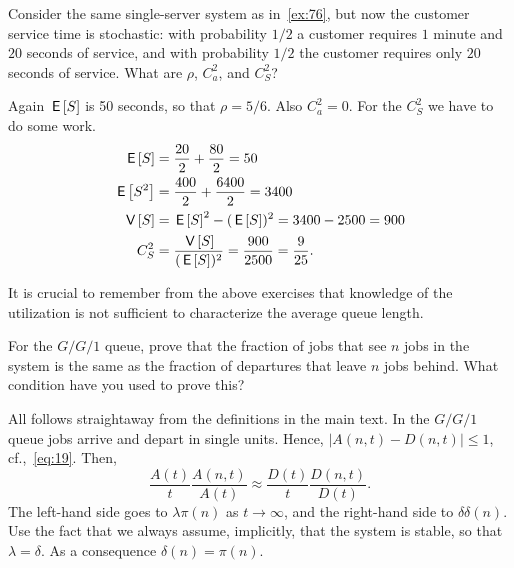\begin{exercise}\label{ex:76}
  Consider the same single-server system as in~\cref{ex:76}, but now the customer service time is stochastic: with probability $1/2$ a customer requires $1$ minute and $20$ seconds of service, and with probability $1/2$ the customer requires only $20$ seconds of service.
  What are $\rho$, $C_a^2$, and $C_S^2$?
\begin{solution}
 Again $\,\mathsf{E}\left[S\right]$ is 50 seconds, so that $\rho = 5/6$. Also
      $C_a^2=0$. For the $C_S^2$ we have to do some work. 
      \begin{equation*}
        \begin{split}
          \,\mathsf{E}\left[S\right] &=  \frac{20}2 + \frac{80}2 = 50 \\
          \,\mathsf{E}\left[S^2\right] &=  \frac{400}2 + \frac{6400} 2 = 3400 \\
          \,\mathsf{V}\left[S\right] &=  \,\mathsf{E}\left[S\right]^2 - (\,\mathsf{E}\left[S\right])^2 = 3400 - 2500 = 900 \\
          C_S^2 &=  \frac{\,\mathsf{V}\left[S\right]}{(\,\mathsf{E}\left[S\right])^2} = \frac{900}{2500}=\frac{9}{25}.
        \end{split}
      \end{equation*}
\end{solution}
It is crucial to remember from the above exercises that knowledge of the   utilization is not sufficient to characterize the average queue   length.
\end{exercise}

\begin{extra}
  For the $G/G/1$ queue, prove that the fraction of jobs that see $n$ jobs in the system is the same as the fraction of departures that leave $n$ jobs behind.
  What condition have you used to prove this?
\begin{solution}
    All follows straightaway from the definitions in the main text.
    In the $G/G/1$ queue jobs arrive and depart in single units.
    Hence, $|A(n,t)-D(n,t)|\leq 1$, cf.,~\cref{eq:19}.
    Then,
    \begin{equation*}
      \frac{A(t)}{t}\frac{A(n,t)}{A(t)} \approx 
      \frac{D(t)}{t}\frac{D(n,t)}{D(t)}. 
    \end{equation*}
    The left-hand side goes to $\lambda \pi(n)$ as $t\to\infty$, and
    the right-hand side to $\delta \delta(n)$. Use the fact that we
    always assume, implicitly, that the system is stable, so that
    $\lambda = \delta$. As a consequence $\delta(n) = \pi(n)$.
\end{solution}
\end{extra}


